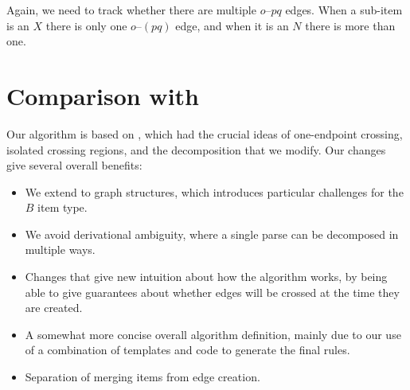 \noindent
\begin{minipage}{\deductionRuleLength}
\centering
\hfill{}\hfill
{}
\end{minipage}
\vspace{5mm}

Again, we need to track whether there are multiple $o$--$pq$ edges.
When a sub-item is an $X$ there is only one $o$--$(pq)$ edge, and when it is an $N$ there is more than one.

\section{Comparison with \textcite{ec}} \label{sec:ec-comparison}

Our algorithm is based on \textcite{ec}, which had the crucial ideas of one-endpoint crossing, isolated crossing regions, and the decomposition that we modify.
Our changes give several overall benefits:

\begin{itemize}
  \item We extend to graph structures, which introduces particular challenges for the $B$ item type.
  \item We avoid derivational ambiguity, where a single parse can be decomposed in multiple ways.
  \item Changes that give new intuition about how the algorithm works, by being able to give guarantees about whether edges will be crossed at the time they are created.
  \item A somewhat more concise overall algorithm definition, mainly due to our use of a combination of templates and code to generate the final rules.
  \item Separation of merging items from edge creation.
\end{itemize}

